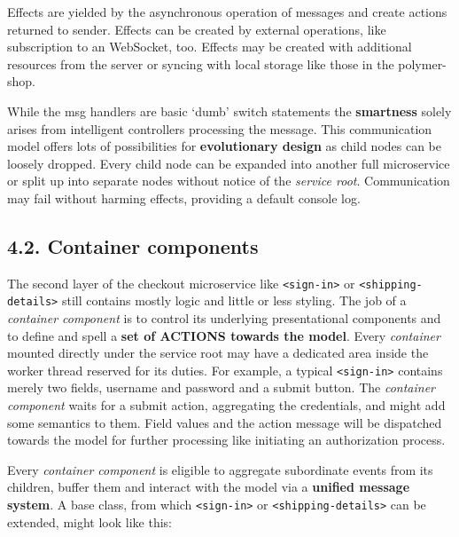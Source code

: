 \documentclass[]{article}
\begin{document}
Effects are yielded by the asynchronous operation of messages and create
actions returned to sender. Effects can be created by external
operations, like subscription to an WebSocket, too. Effects may be
created with additional resources from the server or syncing with local
storage like those in the polymer-shop.

While the msg handlers are basic `dumb' switch statements the
\textbf{smartness} solely arises from intelligent controllers processing
the message. This communication model offers lots of possibilities for
\textbf{evolutionary design} as child nodes can be loosely dropped.
Every child node can be expanded into another full microservice or split
up into separate nodes without notice of the \emph{service root}.
Communication may fail without harming effects, providing a default
console log.

\subsection{4.2. Container components}\label{container-components}

The second layer of the checkout microservice like
\texttt{\textless{}sign-in\textgreater{}} or
\texttt{\textless{}shipping-details\textgreater{}} still contains mostly
logic and little or less styling. The job of a \emph{container
component} is to control its underlying presentational components and to
define and spell a \textbf{set of ACTIONS towards the model}. Every
\emph{container} mounted directly under the service root may have a
dedicated area inside the worker thread reserved for its duties. For
example, a typical \texttt{\textless{}sign-in\textgreater{}} contains
merely two fields, username and password and a submit button. The
\emph{container component} waits for a submit action, aggregating the
credentials, and might add some semantics to them. Field values and the
action message will be dispatched towards the model for further
processing like initiating an authorization process.

Every \emph{container component} is eligible to aggregate subordinate
events from its children, buffer them and interact with the model via a
\textbf{unified message system}. A base class, from which
\texttt{\textless{}sign-in\textgreater{}} or
\texttt{\textless{}shipping-details\textgreater{}} can be extended,
might look like this:
\end{document}
